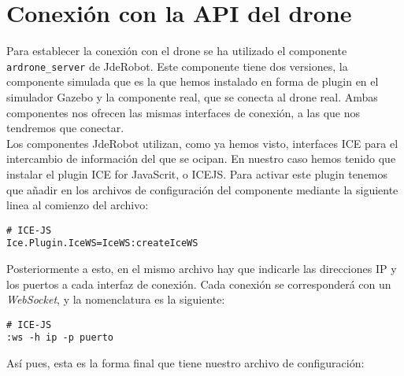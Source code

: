 \section{Conexión con la API del drone}

Para establecer la conexión con el drone se ha utilizado el componente \texttt{ardrone\_server} de JdeRobot. Este componente tiene dos versiones, la componente simulada que es la que hemos instalado en forma de plugin en el simulador Gazebo y la componente real, que se conecta al drone real. Ambas componentes nos ofrecen las mismas interfaces de conexión, a las que nos tendremos que conectar.\\

Los componentes JdeRobot utilizan, como ya hemos visto, interfaces ICE para el intercambio de información del que se ocipan. En nuestro caso hemos tenido que instalar el plugin ICE for JavaScrit, o ICE\-JS. Para activar este plugin tenemos que añadir en los archivos de configuración del componente mediante la siguiente linea al comienzo del archivo:\\

\begin{lstlisting}[caption=Activación del plugin ICEJS]
# ICE-JS
Ice.Plugin.IceWS=IceWS:createIceWS
\end{lstlisting}

Posteriormente a esto, en el mismo archivo hay que indicarle las direcciones IP y los puertos a cada interfaz de conexión. Cada conexión se corresponderá con un \emph{WebSocket}, y la nomenclatura es la siguiente:\\

\begin{lstlisting}[caption=Formato \emph{endpoints} de los \emph{WebSocket} de ICEJS]
# ICE-JS
:ws -h ip -p puerto
\end{lstlisting}

Así pues, esta es la forma final que tiene nuestro archivo de configuración:\\

